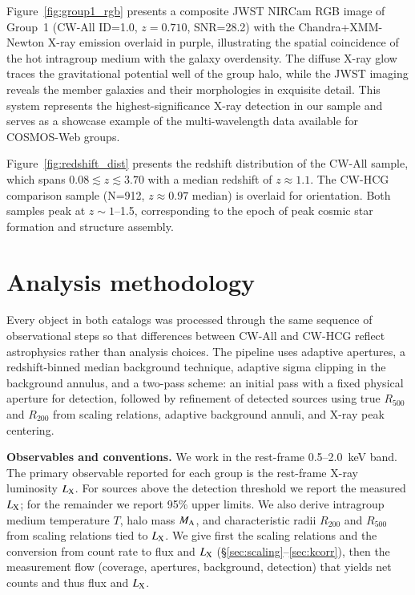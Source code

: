 \documentclass{aa}
\begin{document}
Figure~\ref{fig:group1_rgb} presents a composite JWST NIRCam RGB image of Group~1 (CW-All ID=1.0, $z = 0.710$, SNR=28.2) with the Chandra+XMM-Newton X-ray emission overlaid in purple, illustrating the spatial coincidence of the hot intragroup medium with the galaxy overdensity. The diffuse X-ray glow traces the gravitational potential well of the group halo, while the JWST imaging reveals the member galaxies and their morphologies in exquisite detail. This system represents the highest-significance X-ray detection in our sample and serves as a showcase example of the multi-wavelength data available for COSMOS-Web groups.

Figure~\ref{fig:redshift_dist} presents the redshift distribution of the CW-All sample, which spans $0.08 \lesssim z \lesssim 3.70$ with a median redshift of $z \approx 1.1$. The CW-HCG comparison sample (N=912, $z \approx 0.97$ median) is overlaid for orientation. Both samples peak at $z \sim 1$--1.5, corresponding to the epoch of peak cosmic star formation and structure assembly.

\section{Analysis methodology}
\label{sec:analysis}

Every object in both catalogs was processed through the same sequence of observational steps so that differences between CW-All and CW-HCG reflect astrophysics rather than analysis choices. The pipeline uses adaptive apertures, a redshift-binned median background technique, adaptive sigma clipping in the background annulus, and a two-pass scheme: an initial pass with a fixed physical aperture for detection, followed by refinement of detected sources using true $R_{500}$ and $R_{200}$ from scaling relations, adaptive background annuli, and X-ray peak centering.

\noindent\textbf{Observables and conventions.} We work in the rest-frame 0.5--2.0~keV band. The primary observable reported for each group is the rest-frame X-ray luminosity $L_{\rm X}$. For sources above the detection threshold we report the measured $L_{\rm X}$; for the remainder we report 95\% upper limits. We also derive intragroup medium temperature $T$, halo mass $M_{\rm A}$, and characteristic radii $R_{200}$ and $R_{500}$ from scaling relations tied to $L_{\rm X}$. We give first the scaling relations and the conversion from count rate to flux and $L_{\rm X}$ (\S\ref{sec:scaling}--\ref{sec:kcorr}), then the measurement flow (coverage, apertures, background, detection) that yields net counts and thus flux and $L_{\rm X}$.
\end{document}
